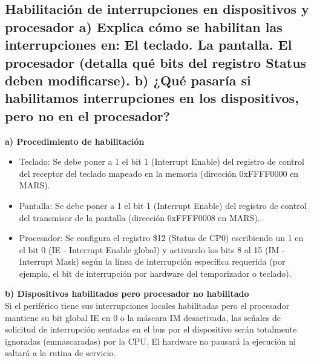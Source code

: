\documentclass[12pt, a4paper]{article}
\begin{document}
\subsection{Habilitación de interrupciones en dispositivos y procesador a) Explica cómo se habilitan las interrupciones en: El teclado. La pantalla. El procesador (detalla qué bits del registro Status deben modificarse). b) ¿Qué pasaría si habilitamos interrupciones en los dispositivos, pero no en el procesador?}
    \textbf{a) Procedimiento de habilitación}
    \begin{itemize}
        \item Teclado: Se debe poner a 1 el bit 1 (Interrupt Enable) del registro de control del receptor del teclado mapeado en la memoria (dirección 0xFFFF0000 en MARS).
        \item Pantalla: Se debe poner a 1 el bit 1 (Interrupt Enable) del registro de control del transmisor de la pantalla (dirección 0xFFFF0008 en MARS).
        \item Procesador: Se configura el registro \$12 (Status de CP0) escribiendo un 1 en el bit 0 (IE - Interrupt Enable global) y activando los bits 8 al 15 (IM - Interrupt Mask) según la línea de interrupción específica requerida (por ejemplo, el bit de interrupción por hardware del temporizador o teclado).
    \end{itemize}
    \textbf{b) Dispositivos habilitados pero procesador no habilitado}\\
    Si el periférico tiene sus interrupciones locales habilitadas pero el procesador mantiene su bit global IE en 0 o la máscara IM desactivada, las señales de solicitud de interrupción sentadas en el bus por el dispositivo serán totalmente ignoradas (enmascaradas) por la CPU. El hardware no pausará la ejecución ni saltará a la rutina de servicio.
\end{document}

